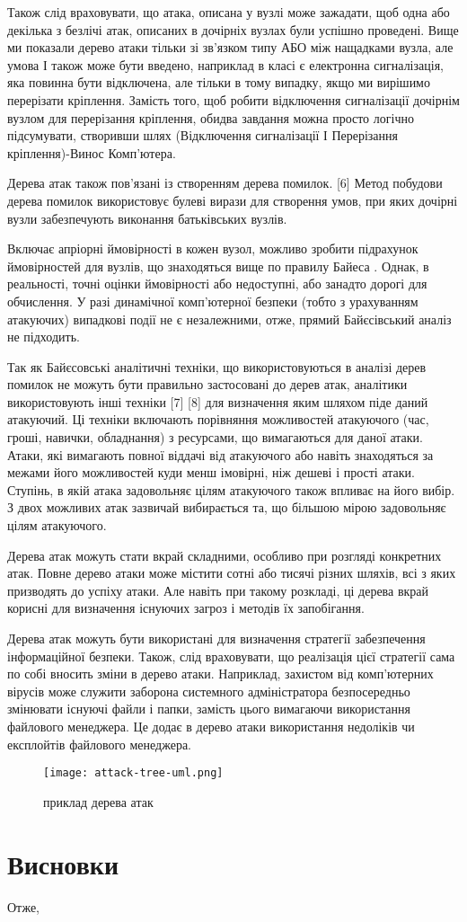 Також слід враховувати, що атака, описана у вузлі може зажадати, щоб одна або декілька з безлічі атак, описаних в дочірніх вузлах були успішно проведені. Вище ми показали дерево атаки тільки зі зв'язком типу АБО між нащадками вузла, але умова І також може бути введено, наприклад в класі є електронна сигналізація, яка повинна бути відключена, але тільки в тому випадку, якщо ми вирішимо перерізати кріплення. Замість того, щоб робити відключення сигналізації дочірнім вузлом для перерізання кріплення, обидва завдання можна просто логічно підсумувати, створивши шлях (Відключення сигналізації І Перерізання кріплення)-Винос Комп'ютера.

Дерева атак також пов'язані із створенням дерева помилок. {[}6{]} Метод побудови дерева помилок використовує булеві вирази для створення умов, при яких дочірні вузли забезпечують виконання батьківських вузлів.

Включає апріорні ймовірності в кожен вузол, можливо зробити підрахунок ймовірностей для вузлів, що знаходяться вище по правилу Байеса . Однак, в реальності, точні оцінки ймовірності або недоступні, або занадто дорогі для обчислення. У разі динамічної комп'ютерної безпеки (тобто з урахуванням атакуючих) випадкові події не є незалежними, отже, прямий Байєсівський аналіз не підходить.

Так як Байєсовські аналітичні техніки, що використовуються в аналізі дерев помилок не можуть бути правильно застосовані до дерев атак, аналітики використовують інші техніки {[}7{]} {[}8{]} для визначення яким шляхом піде даний атакуючий. Ці техніки включають порівняння можливостей атакуючого (час, гроші, навички, обладнання) з ресурсами, що вимагаються для даної атаки. Атаки, які вимагають повної віддачі від атакуючого або навіть знаходяться за межами його можливостей куди менш імовірні, ніж дешеві і прості атаки. Ступінь, в якій атака задовольняє цілям атакуючого також впливає на його вибір. З двох можливих атак зазвичай вибирається та, що більшою мірою задовольняє цілям атакуючого.

Дерева атак можуть стати вкрай складними, особливо при розгляді конкретних атак. Повне дерево атаки може містити сотні або тисячі різних шляхів, всі з яких призводять до успіху атаки. Але навіть при такому розкладі, ці дерева вкрай корисні для визначення існуючих загроз і методів їх запобігання.

Дерева атак можуть бути використані для визначення стратегії забезпечення інформаційної безпеки. Також, слід враховувати, що реалізація цієї стратегії сама по собі вносить зміни в дерево атаки. Наприклад, захистом від комп'ютерних вірусів може служити заборона системного адміністратора безпосередньо змінювати існуючі файли і папки, замість цього вимагаючи використання файлового менеджера. Це додає в дерево атаки використання недоліків чи експлойтів файлового менеджера.


\begin{figure}
    \centering
    \texttt{[image: attack-tree-uml.png]}
    \caption{приклад дерева атак}
    \label{fig:attack_tree_example}
\end{figure}

\section*{Висновки}
Отже,

